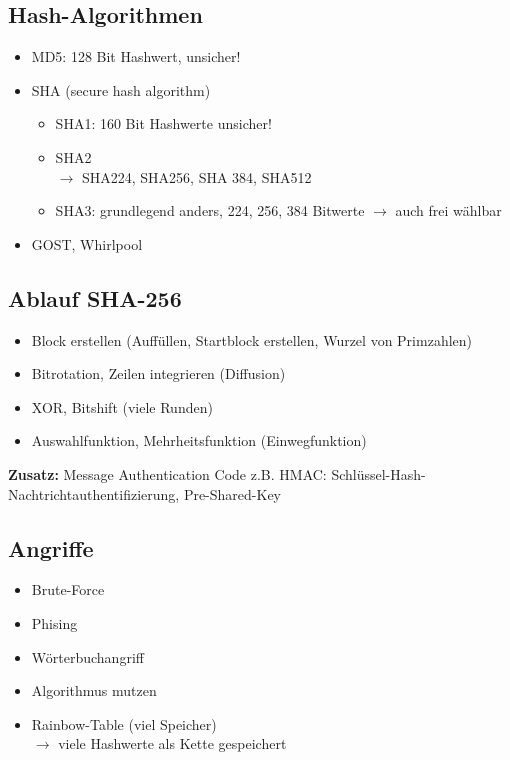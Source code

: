 \subsection*{Hash-Algorithmen}
\begin{itemize}
	\item MD5: 128 Bit Hashwert, unsicher!
	\item SHA (secure hash algorithm)
	\begin{itemize}
		\item SHA1: 160 Bit Hashwerte unsicher!
		\item SHA2 \\
		$\rightarrow$ SHA224, SHA256, SHA 384, SHA512
		\item SHA3: grundlegend anders, 224, 256, 384 Bitwerte $\rightarrow$ auch frei wählbar
	\end{itemize}
	\item GOST, Whirlpool
\end{itemize}

\subsection*{Ablauf SHA-256} 
\begin{itemize}
	\item Block erstellen (Auffüllen, Startblock erstellen, Wurzel von Primzahlen)
	\item Bitrotation, Zeilen integrieren (Diffusion)
	\item XOR, Bitshift (viele Runden)
	\item Auswahlfunktion, Mehrheitsfunktion (Einwegfunktion)
\end{itemize}

\textbf{Zusatz:} Message Authentication Code z.B. HMAC: Schlüssel-Hash-Nachtrichtauthentifizierung, Pre-Shared-Key

\subsection*{Angriffe}
\begin{itemize}
	\item Brute-Force
	\item Phising
	\item Wörterbuchangriff
	\item Algorithmus mutzen
	\item Rainbow-Table (viel Speicher) \\
	$\rightarrow$ viele Hashwerte als Kette gespeichert
\end{itemize}

